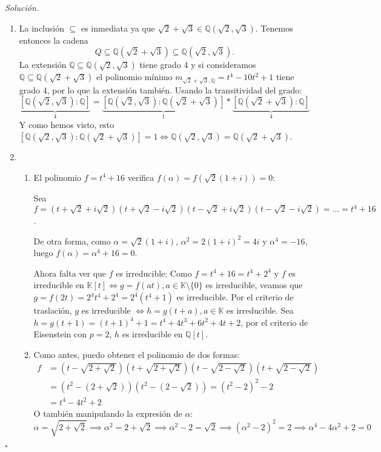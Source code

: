 \documentclass[10pt, spanish]{report}
\theoremstyle{definition}
\newenvironment{sol}{\textit{Solución.}}{\hfill$\square$}
\newcommand{\Q}{\mathbb{Q}}
\newcommand{\K}{\mathbb{K}}
\newcommand{\fecha}[1]{\marginpar{\underline{#1}}}
\begin{document}
\fecha{25/02}
\begin{sol}
    \begin{enumerate}
        \item La inclusión $\subseteq$ es inmediata ya que $\sqrt{2}+\sqrt{3}\in
            \Q(\sqrt{2},\sqrt{3})$. Tenemos entonces la cadena
            \[Q\subseteq\Q(\sqrt{2}+\sqrt{3})\subseteq\Q(\sqrt{2},\sqrt{3}).\]
            La extensión $\Q\subseteq\Q(\sqrt{2},\sqrt{3})$ tiene grado 4 y si
            consideramos $\Q\subseteq\Q(\sqrt{2}+\sqrt{3})$ el polinomio mínimo
            $m_{\sqrt{2}+\sqrt{3},\Q}=t^4-10t^2+1$ tiene grado 4, por lo que la
            extensión también. Usando la transitividad del grado:
            \[\underbrace{[\Q(\sqrt{2},\sqrt{3}):\Q]}_{4}=
                \underbrace{[\Q(\sqrt{2},\sqrt{3}):\Q(\sqrt{2}+\sqrt{3})]}_{1}*
                \underbrace{[\Q(\sqrt{2}+\sqrt{3}):\Q]}_{4}\]
                Y como hemos visto, esto
                $[\Q(\sqrt{2},\sqrt{3}):\Q(\sqrt{2}+\sqrt{3})]=1\Leftrightarrow
                \Q(\sqrt{2},\sqrt{3})=\Q(\sqrt{2}+\sqrt{3})$.
        \item
            \begin{enumerate}
                \item El polinomio $f=t^4+16$ verifica $f(\alpha)=
                    f(\sqrt{2}(1+i))=0$:

                    Sea $f=(t+\sqrt{2}+i\sqrt{2})(t+\sqrt{2}-i\sqrt{2})
                    (t-\sqrt{2}+i\sqrt{2})(t-\sqrt{2}-i\sqrt{2})=\ldots=t^4+16$.

                    De otra forma, como $\alpha=\sqrt{2}(1+i)$,
                    $\alpha^2=2(1+i)^2=4i$ y $\alpha^4=-16$, luego
                    $f(\alpha)=\alpha^4+16=0$.

                    Ahora falta ver que $f$ es irreducible:
                    Como $f=t^4+16=t^4+2^4$ y $f$ es irreducible en $\K[t]
                    \Leftrightarrow g=f(at), a\in \K\setminus\{0\}$ es
                    irreducible, veamos que $g=f(2t)=2^4t^4+2^4=2^4(t^4+1)$ es
                    irreducible. Por el criterio de traslación, $g$ es
                    irreducible $\Leftrightarrow h=g(t+a), a\in\K$ es
                    irreducible. Sea $h=g(t+1)=(t+1)^4+1=t^4+4t^3+6t^2+4t+2$,
                    por el criterio de Eisenstein con $p=2$, $h$ es irreducible
                    en $\Q[t]$.
                \item Como antes, puedo obtener el polinomio de dos formas:
                    \begin{align*}
                        f&=(t-\sqrt{2+\sqrt{2}})(t+\sqrt{2+\sqrt{2}})
                        (t-\sqrt{2-\sqrt{2}})(t+\sqrt{2-\sqrt{2}})\\
                         &=(t^2-(2+\sqrt{2}))(t^2-(2-\sqrt{2}))=(t^2-2)^2-2\\
                         &=t^4-4t^2+2
                    \end{align*}
                    O también manipulando la expresión de $\alpha$:
                    \[\alpha=\sqrt{2+\sqrt{2}}\implies\alpha^2=2+\sqrt{2}
                     \implies\alpha^2-2=\sqrt{2}\implies(\alpha^2-2)^2=2\implies
                     \alpha^4-4\alpha^2+2=0\]


\end{enumerate}
\end{enumerate}
\end{sol}
\end{document}
